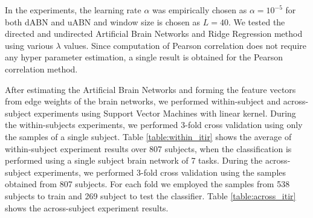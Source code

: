 \documentclass[runningheads]{llncs}
\begin{document}

In the experiments, the learning rate $\alpha$ was empirically chosen as $\alpha = 10^{-5}$ for both dABN and uABN and window size is chosen as $L = 40$. We tested the directed and undirected Artificial Brain Networks and Ridge Regression method using various $\lambda$ values. Since computation of Pearson correlation does not require any hyper parameter  estimation, a single result is obtained for the Pearson correlation method. 


After estimating the Artificial Brain Networks and forming the feature vectors from edge weights of the brain networks, we performed within-subject and across-subject experiments using Support Vector Machines with linear kernel. During the within-subjects experiments, we performed 3-fold cross validation using only the samples of a single subject. Table \ref{table:within_itir} shows the average of within-subject experiment results over 807 subjects, when the classification is performed using a single subject brain network of 7 tasks. During the across-subject experiments, we performed 3-fold cross validation using the samples obtained from 807 subjects. For each fold we employed the samples from 538 subjects to train and 269 subject to test the classifier. Table \ref{table:across_itir} shows the across-subject experiment results. %
 
\end{document}
